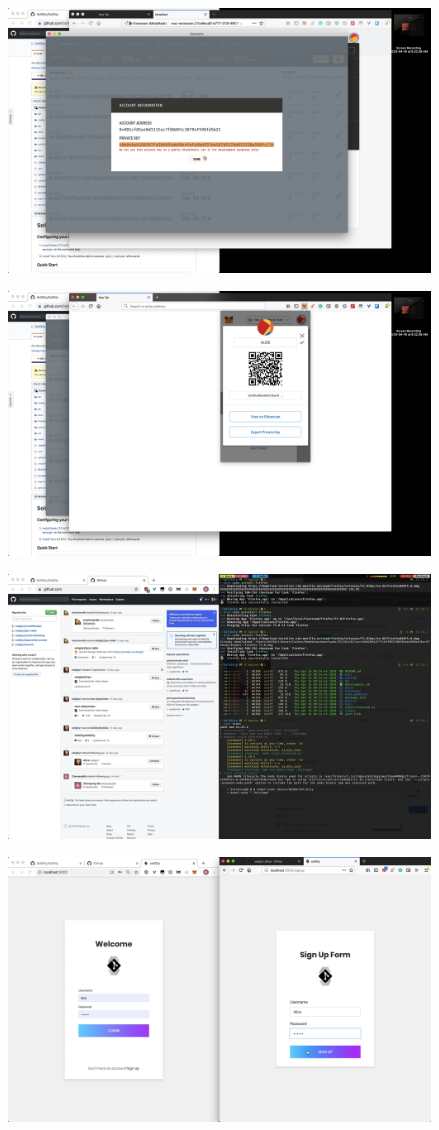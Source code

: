 \documentclass[12pt]{article}
\renewcommand{\_}{\kern-1.5pt\textunderscore\kern-1.5pt}
\begin{document}
\includegraphics[height=7cm]{graphs/12. metamask_setup_alice}

\includegraphics[height=7cm]{graphs/13. metamask_setup_alice}

\includegraphics[height=7cm]{graphs/14. yarn_start}

\includegraphics[height=7cm]{graphs/15. alice_sign_up}
\end{document}
